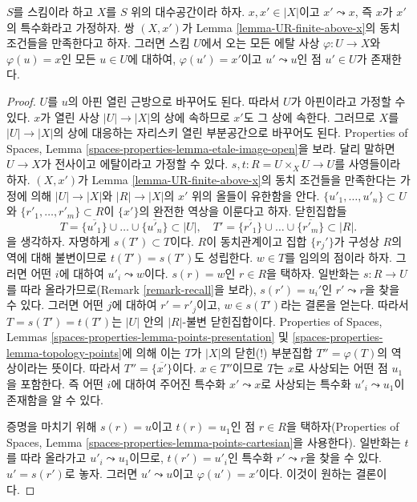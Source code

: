 \begin{lemma}
\label{lemma-specialization}
$S$를 스킴이라 하고 $X$를 $S$ 위의 대수공간이라 하자.
$x, x' \in |X|$이고 $x' \leadsto x$, 즉 $x$가 $x'$의 특수화라고
가정하자. 쌍 $(X, x')$가 Lemma
\ref{lemma-UR-finite-above-x}의 동치 조건들을 만족한다고 하자.
그러면 스킴 $U$에서 오는 모든 에탈 사상 $\varphi : U \to X$와
$\varphi(u) = x$인 모든 $u \in U$에 대하여, $\varphi(u') = x'$이고
$u' \leadsto u$인 점 $u'\in U$가 존재한다.
\end{lemma}

\begin{proof}
$U$를 $u$의 아핀 열린 근방으로 바꾸어도 된다. 따라서 $U$가
아핀이라고 가정할 수 있다. $x$가 열린 사상 $|U| \to |X|$의 상에
속하므로 $x'$도 그 상에 속한다. 그러므로 $X$를
$|U| \to |X|$의 상에 대응하는 자리스키 열린 부분공간으로
바꾸어도 된다. Properties of Spaces, Lemma
\ref{spaces-properties-lemma-etale-image-open}을 보라.
달리 말하면 $U \to X$가 전사이고 에탈이라고 가정할 수 있다.
$s, t : R = U \times_X U \to U$를 사영들이라 하자.
$(X, x')$가 Lemma \ref{lemma-UR-finite-above-x}의 동치 조건들을
만족한다는 가정에 의해 $|U| \to |X|$와 $|R| \to |X|$의
$x'$ 위의 올들이 유한함을 안다.
$\{u'_1, \ldots, u'_n\} \subset U$와
$\{r'_1, \ldots, r'_m\} \subset R$이 $\{x'\}$의 완전한 역상을
이룬다고 하자. 닫힌집합들
$$
T = \overline{\{u'_1\}} \cup \ldots \cup \overline{\{u'_n\}} \subset |U|,
\quad
T' = \overline{\{r'_1\}} \cup \ldots \cup \overline{\{r'_m\}} \subset |R|.
$$
을 생각하자. 자명하게 $s(T') \subset T$이다.
$R$이 동치관계이고 집합 $\{r_j'\}$가 구성상 $R$의 역에 대해
불변이므로 $t(T') = s(T')$도 성립한다.
$w \in T$를 임의의 점이라 하자. 그러면 어떤 $i$에 대하여
$u'_i \leadsto w$이다. $s(r) = w$인 $r \in R$을 택하자.
일반화는 $s : R \to U$를 따라 올라가므로(Remark
\ref{remark-recall}을 보라), $s(r') = u_i'$인 $r' \leadsto r$을
찾을 수 있다. 그러면 어떤 $j$에 대하여 $r' = r'_j$이고,
$w \in s(T')$라는 결론을 얻는다. 따라서
$T = s(T') = t(T')$는 $|U|$ 안의 $|R|$-불변 닫힌집합이다.
Properties of Spaces, Lemmas
\ref{spaces-properties-lemma-points-presentation} 및
\ref{spaces-properties-lemma-topology-points}에 의해 이는 $T$가
$|X|$의 닫힌(!) 부분집합 $T'' = \varphi(T)$의 역상이라는 뜻이다.
따라서 $T'' = \overline{\{x'\}}$이다. $x \in T''$이므로 $T$는
$x$로 사상되는 어떤 점 $u_1$을 포함한다. 즉 어떤 $i$에 대하여
주어진 특수화 $x' \leadsto x$로 사상되는 특수화
$u'_i \leadsto u_1$이 존재함을 알 수 있다.

\medskip\noindent
증명을 마치기 위해 $s(r) = u$이고 $t(r) = u_1$인 점 $r \in R$을
택하자(Properties of Spaces, Lemma
\ref{spaces-properties-lemma-points-cartesian}을 사용한다).
일반화는 $t$를 따라 올라가고 $u'_i \leadsto u_1$이므로,
$t(r') = u'_i$인 특수화 $r' \leadsto r$을 찾을 수 있다.
$u' = s(r')$로 놓자. 그러면 $u' \leadsto u$이고
$\varphi(u') = x'$이다. 이것이 원하는 결론이다.
\end{proof}

